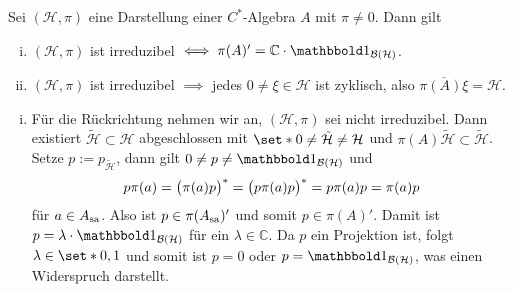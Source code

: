 \begin{satz}[{name=[Eigenschaften irreduzibler Darstellungen]},label=satz:73]
	Sei $(\mathcal{H},\pi)$ eine Darstellung einer $C^*$-Algebra $A$ mit $\pi \neq 0$. Dann gilt
	\begin{enumerate}[(i),itemsep=1pt]
		\item $(\mathcal{H},\pi)$ ist irreduzibel $\iff \pi(A)'= \mathbb{C} \cdot \ind_{\mathcal{B}(\mathcal{H})}$.
		\item $(\mathcal{H},\pi)$ ist irreduzibel $\implies$ jedes $0 \neq \xi \in \mathcal{H}$ ist zyklisch, also $\overline{\pi(A)\xi}=\mathcal{H}$.
	\end{enumerate}
\end{satz}
\begin{beweis}
	\leavevmode
	\begin{enumerate}[(i)]
		\item Für die Rückrichtung nehmen wir an, $(\mathcal{H},\pi)$ sei nicht irreduzibel. 
		Dann existiert $\tilde{\mathcal{H}} \subset \mathcal{H}$ abgeschlossen mit $\set*{0} \neq \tilde{\mathcal{H}}\neq \mathcal{H}$ und $\pi(A)\tilde{\mathcal{H}} \subset \tilde{\mathcal{H}}$.
		Setze $p := p_{\tilde{\mathcal{H}}}$, dann gilt $0 \neq p \neq \ind_{\mathcal{B}(\mathcal{H})}$ und 
		\[
			p \pi(a)=\enbrace[\big]{\pi(a)p}^* =\enbrace[\big]{p \pi(a)p}^*=p \pi(a) p=\pi(a)p 
		\]
		für $a \in A_\sa$. 
		Also ist $p	\in \pi(A_\sa)'$ und somit $p \in \pi(A)'$.
		Damit ist $p= \lambda \cdot \ind_{\mathcal{B}(\mathcal{H})}$ für ein $\lambda \in \mathbb{C}$.
		Da $p$ ein Projektion ist, folgt $\lambda \in \set*{0,1}$ und somit ist $p=0$ oder $p=\ind_{\mathcal{B}(\mathcal{H})}$, was einen Widerspruch darstellt.
		

\end{enumerate}
\end{beweis}

